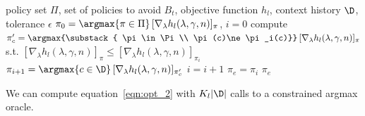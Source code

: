 \documentclass{article}
\newcommand{\pill}{\widehat{\pi}_{l-1}}
\newcommand{\1}{\mathbf{1}}
\begin{document}

\begin{algorithm}[!htb]
\caption{Constrained cost-sensitive classification}
\begin{algorithmic}[1]\label{alg:c_csc}
\REQUIRE policy set $\Pi$, set of policies to avoid $B_t$, objective function $h_l$, context history $\D$, tolerance $\epsilon$
\STATE $\pi_0=\argmax{\pi\in\Pi}\,[\nabla_\lambda h_l(\lambda,\gamma,n)]_\pi$, $i=0$
\STATE compute $\pi'_c=\argmax{\substack{
\pi\in\Pi \\
\pi(c)\ne \pi_i(c)}}\,[\nabla_\lambda h_l(\lambda,\gamma,n)]_\pi$ s.t. $[\nabla_\lambda h_l(\lambda,\gamma,n)]_\pi\leq [\nabla_\lambda h_l(\lambda,\gamma,n)]_{\pi_i}$
\ENDFOR
\STATE $\pi_{i+1}=\argmax{c\in\D}\,[\nabla_\lambda h_l(\lambda,\gamma,n)]_{\pi'_c}$
\STATE $i=i+1$
\ENDWHILE
\STATE $\pi_e=\pi_i$
\ENSURE $\pi_e$
\end{algorithmic}
\end{algorithm}

\begin{lemma}\label{lem:csc_2}
We can compute equation~\eqref{eqn:opt_2} with $K_l|\D|$ calls to a constrained argmax oracle. 
\end{lemma}
\end{document}
